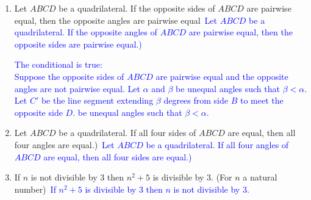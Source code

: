 \documentclass[13.5pt]{article}
\begin{document}
\begin{enumerate}
\begin{enumerate}
\item{Let \(ABCD\) be a quadrilateral. If the opposite sides of \(ABCD\) are pairwise equal, then the opposite angles are pairwise equal}\
\textcolor{blue} {Let \(ABCD\) be a quadrilateral. If the opposite angles of \(ABCD\) are pairwise equal, then the opposite sides are pairwise equal.)}

\textcolor{blue} {The conditional is true:}\\
\textcolor{blue} {Suppose the opposite sides of \(ABCD\) are pairwise equal and the opposite angles are not pairwise equal.} 
\textcolor{blue} {Let \(\alpha\) and \(\beta\) be unequal angles such that \(\beta <\alpha\). }
\textcolor{blue} {Let \(C'\) be the line segment extending \(\beta\) degrees from side \(B\) to meet the opposite side \(D\).  be unequal angles such that \(\beta <\alpha\). }






\item{Let \(ABCD\) be a quadrilateral. If all four sides of \(ABCD\) are equal, then all four angles are equal.)}\
\textcolor{blue} {Let \(ABCD\) be a quadrilateral. If all four angles of \(ABCD\) are equal, then all four sides are equal.)}\
\item{If \(n\) is not divisible by \(3\) then \(n^2+5\) is divisible by \(3\). (For \(n\) a natural number)}\
\textcolor{blue} {If \(n^2+5\) is divisible by \(3\) then \(n\) is not divisible by \(3\).}\


\end{enumerate}

\end{enumerate}
\end{document}
